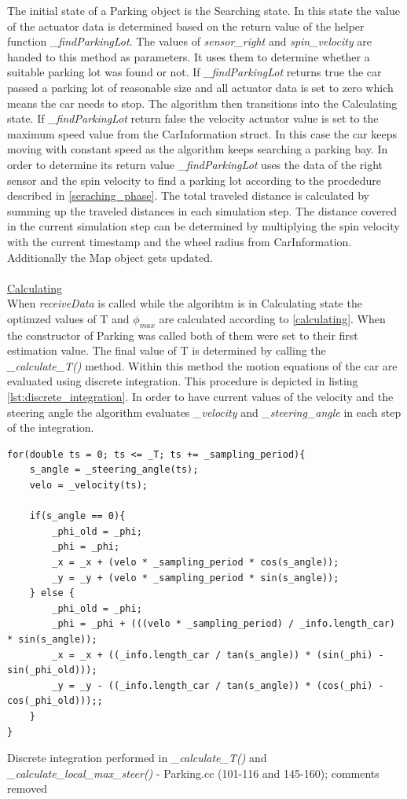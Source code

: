 \documentclass[paper=a4, fontsize=11pt]{scrreprt}
\begin{document}
The initial state of a Parking object is the Searching state. In this state the value of the actuator data is determined based on the return value of the helper function \textit{\_findParkingLot}. The values of \textit{sensor\_right} and \textit{spin\_velocity} are handed to this method as parameters. It uses them to determine whether a suitable parking lot was found or not. If \textit{\_findParkingLot} returns true the car passed a parking lot of reasonable size and all actuator data is set to zero which means the car needs to stop. The algorithm then transitions into the Calculating state. If \textit{\_findParkingLot} return false the velocity actuator value is set to the maximum speed value from the CarInformation struct. In this case the car keeps moving with constant speed as the algorithm keeps searching a parking bay. In order to determine its return value \textit{\_findParkingLot} uses the data of the right sensor and the spin velocity to find a parking lot according to the procdedure described in \ref{seraching_phase}. The total traveled distance is calculated by summing up the traveled distances in each simulation step. The distance covered in the current simulation step can be determined by multiplying the spin velocity with the current timestamp and the wheel radius from CarInformation. Additionally the Map object gets updated.\\
\\
\underline{Calculating}\\
When \textit{receiveData} is called while the algorihtm is in Calculating state the optimzed values of T and $\phi_{max}$ are calculated according to \ref{calculating}. When the constructor of Parking was called both of them were set to their first estimation value. The final value of T is determined by calling the \textit{\_calculate\_T()} method. Within this method the motion equations of the car are evaluated using discrete integration. This procedure is depicted in listing \ref{lst:discrete_integration}. In order to have current values of the velocity and the steering angle the algorithm evaluates \textit{\_velocity} and \textit{\_steering\_angle} in each step of the integration.
\begin{listing}[H]
\begin{verbatim}
for(double ts = 0; ts <= _T; ts += _sampling_period){
	s_angle = _steering_angle(ts);
    velo = _velocity(ts);

    if(s_angle == 0){
		_phi_old = _phi;
		_phi = _phi;
		_x = _x + (velo * _sampling_period * cos(s_angle));
		_y = _y + (velo * _sampling_period * sin(s_angle));
	} else {
		_phi_old = _phi;
		_phi = _phi + (((velo * _sampling_period) / _info.length_car) * sin(s_angle));
		_x = _x + ((_info.length_car / tan(s_angle)) * (sin(_phi) - sin(_phi_old)));
		_y = _y - ((_info.length_car / tan(s_angle)) * (cos(_phi) - cos(_phi_old)));;
	}
}
\end{verbatim}
\caption{\tiny Discrete integration performed in \textit{\_calculate\_T()} and \textit{\_calculate\_local\_max\_steer()} - Parking.cc (101-116 and 145-160); comments removed}
\label{lst:discrete_integration}
\end{listing}
\end{document}
